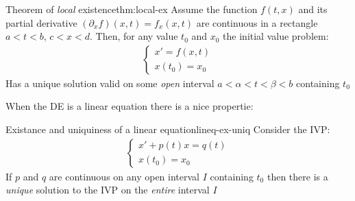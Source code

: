 \documentclass[../ode.tex]{subfiles}
\begin{document}
    \begin{thm}{Theorem of \emph{local} existence}{thm:local-ex}
        Assume the function $f(t,x)$ and its partial derivative $(\partial_{x} f)(x,t) = f_{x}(x,t)$ are continuous in a rectangle
        $a<t<b$, $c<x<d$. Then, for any value  $t_0$ and $x_0$ the initial value problem:
        \begin{gather*}
            \begin{cases}
                x'=f(x,t)\\
                x(t_0) = x_0
            \end{cases}
        \end{gather*}
        Has a unique solution valid on some \emph{open} interval $a< \alpha < t< \beta < b$ containing $t_0$
    \end{thm}
    
    When the DE is a linear equation there is a nice propertie:
    \begin{prop}{Existance and uniquiness of a linear equation}{lineq-ex-uniq}
        Consider the IVP:
        \begin{gather*}
            \begin{cases}
                x'+p(t)x=q(t)\\
                x(t_0) = x_0
            \end{cases}
        \end{gather*}
        If $p$ and $q$ are continuous on any open interval $I$ containing $t_0$ then there is a \emph{unique} solution to the
        IVP on the \emph{entire} interval $I$
    \end{prop}
\end{document}

